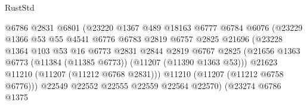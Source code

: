 \begin{lexlean}{RustStd}
\begin{coremodule}
                                        @6786
                                        @2831
                                        @6801
                                        (@23220
                                          @1367
                                          @489
                                          @18163
                                          @6777
                                          @6784
                                          @6076
                                          (@23229
                                            @1366
                                            @53
                                            @55
                                            @4541
                                            @6776
                                            @6783
                                            @2819
                                            @6757
                                            @2825
                                            @21696
                                            (@23228
                                              @1364
                                              @103
                                              @53
                                              @16
                                              @6773
                                              @2831
                                              @2844
                                              @2819
                                              @6767
                                              @2825
                                              (@21656
                                                @1363
                                                @6773
                                                (@11384 (@11385 @6773))
                                                (@11207 (@11390 @1363 @53)))
                                              @21623
                                              @11210
                                              (@11207 (@11212 @6768 @2831)))
                                            @11210
                                            (@11207 (@11212 @6758 @6776)))
                                          @22549
                                          @22552
                                          @22555
                                          @22559
                                          @22564
                                          @22570)
                                        (@23274
                                          @6786
                                          @1375

\end{coremodule}
\end{lexlean}
